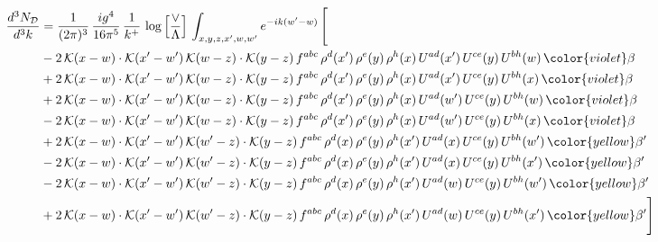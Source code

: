 \begin{align}
\frac{d^{3}N_{\mathcal D}}{d^{3}k} & = \frac{1}{(2\pi)^{3}}\, \frac{ig^{4}}{16\pi^{5}}\, \frac{1}{k^{+}}\, \log{\left[\frac{\vee}{\Lambda}\right]}\, \int_{x,y,z,x^{\prime},w,w^{\prime}}e^{-ik(w^{\prime}-w)}\, \Bigg[\notag \\
& -2\,\mathcal{K}(x-w)\cdot \mathcal{K}(x'-w')\, \mathcal{K}(w-z)\cdot \mathcal{K}(y-z)\, f^{abc}\,\rho^{d}(x')\,\rho^{e}(y)\,\rho^{h}(x)\, U^{ad}(x')\,U^{ce}(y)\,U^{bh}(w)\,{\color{violet} \beta}\notag \\
& +2\,\mathcal{K}(x-w)\cdot \mathcal{K}(x'-w')\, \mathcal{K}(w-z)\cdot \mathcal{K}(y-z)\, f^{abc}\,\rho^{d}(x')\,\rho^{e}(y)\,\rho^{h}(x)\, U^{ad}(x')\,U^{ce}(y)\,U^{bh}(x)\,{\color{violet} \beta}\notag \\
& +2\,\mathcal{K}(x-w)\cdot \mathcal{K}(x'-w')\, \mathcal{K}(w-z)\cdot \mathcal{K}(y-z)\, f^{abc}\,\rho^{d}(x')\,\rho^{e}(y)\,\rho^{h}(x)\, U^{ad}(w')\,U^{ce}(y)\,U^{bh}(w)\,{\color{violet} \beta}\notag \\
& -2\,\mathcal{K}(x-w)\cdot \mathcal{K}(x'-w')\, \mathcal{K}(w-z)\cdot \mathcal{K}(y-z)\, f^{abc}\,\rho^{d}(x')\,\rho^{e}(y)\,\rho^{h}(x)\, U^{ad}(w')\,U^{ce}(y)\,U^{bh}(x)\,{\color{violet} \beta}\notag \\
& +2\,\mathcal{K}(x-w)\cdot \mathcal{K}(x'-w')\, \mathcal{K}(w'-z)\cdot \mathcal{K}(y-z)\, f^{abc}\,\rho^{d}(x)\,\rho^{e}(y)\,\rho^{h}(x')\, U^{ad}(x)\,U^{ce}(y)\,U^{bh}(w')\,{\color{yellow} \beta'}\notag \\
& -2\,\mathcal{K}(x-w)\cdot \mathcal{K}(x'-w')\, \mathcal{K}(w'-z)\cdot \mathcal{K}(y-z)\, f^{abc}\,\rho^{d}(x)\,\rho^{e}(y)\,\rho^{h}(x')\, U^{ad}(x)\,U^{ce}(y)\,U^{bh}(x')\,{\color{yellow} \beta'}\notag \\
& -2\,\mathcal{K}(x-w)\cdot \mathcal{K}(x'-w')\, \mathcal{K}(w'-z)\cdot \mathcal{K}(y-z)\, f^{abc}\,\rho^{d}(x)\,\rho^{e}(y)\,\rho^{h}(x')\, U^{ad}(w)\,U^{ce}(y)\,U^{bh}(w')\,{\color{yellow} \beta'}\notag \\
& +2\,\mathcal{K}(x-w)\cdot \mathcal{K}(x'-w')\, \mathcal{K}(w'-z)\cdot \mathcal{K}(y-z)\, f^{abc}\,\rho^{d}(x)\,\rho^{e}(y)\,\rho^{h}(x')\, U^{ad}(w)\,U^{ce}(y)\,U^{bh}(x')\,{\color{yellow} \beta'}\Bigg]
\end{align}
